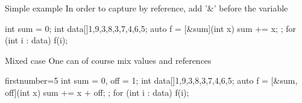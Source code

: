 \begin{frame}[fragile]
  \begin{exampleblock}{Simple example}
    In order to capture by reference, add '\&' before the variable
    \begin{cppcode*}{}
      int sum = 0;
      int data[]{1,9,3,8,3,7,4,6,5};
      auto f = [&sum](int x) { sum += x; };
      for (int i : data) f(i);
    \end{cppcode*}
  \end{exampleblock}
  \pause
  \begin{exampleblock}{Mixed case}
    One can of course mix values and references
    \begin{cppcode*}{firstnumber=5}
      int sum = 0, off = 1;
      int data[]{1,9,3,8,3,7,4,6,5};
      auto f = [&sum, off](int x) { sum += x + off; };
      for (int i : data) f(i);
    \end{cppcode*}
  \end{exampleblock}
\end{frame}

